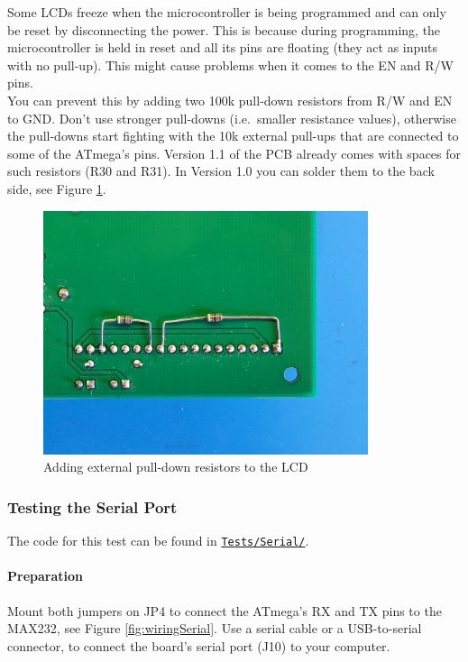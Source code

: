 \documentclass{article}
\newenvironment{note}{\begin{tcolorbox}[colback=blue!5!white,colframe=blue!75!black,title=\textbf{Note}]}{\end{tcolorbox}}
\newcommand{\file}[1]{\texttt{#1}}
\begin{document}
\begin{note}
Some LCDs freeze when the microcontroller is being programmed and can only be reset by disconnecting the power. This is because during programming, the microcontroller is held in reset and all its pins are floating (they act as inputs with no pull-up). This might cause problems when it comes to the EN and R/W pins. \\
You can prevent this by adding two 100k\textOmega{} pull-down resistors from R/W and EN to GND. Don't use stronger pull-downs (i.e.\ smaller resistance values), otherwise the pull-downs start fighting with the 10k\textOmega{} external pull-ups that are connected to some of the ATmega's pins. Version 1.1 of the PCB already comes with spaces for such resistors (R30 and R31). In Version 1.0 you can solder them to the back side, see Figure \ref{fig:lcdPullDowns}. 
\end{note}

\begin{figure}[htb]
\centering
\includegraphics[width=0.85\textwidth]{Pictures/LCDPullDowns.jpg}
\caption{Adding external pull-down resistors to the LCD}
\label{fig:lcdPullDowns}
\end{figure}

\subsubsection{Testing the Serial Port}\label{sec:testSerial}
The code for this test can be found in \href{../Tests/Serial/}{\file{Tests/Serial/}}. 

\paragraph{Preparation}
Mount both jumpers on JP4 to connect the ATmega's RX and TX pins to the MAX232, see Figure \ref{fig:wiringSerial}. Use a serial cable or a USB-to-serial connector, to connect the board's serial port (J10) to your computer. 
\end{document}
